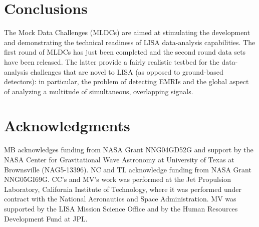 \documentclass{iopart}
\begin{document}
\section{Conclusions}

The Mock Data Challenges (MLDCs) are aimed at stimulating the development and demonstrating the technical readiness of LISA data-analysis capabilities. The first round of MLDCs has just been completed and the second round data sets have been released. The latter provide a fairly realistic testbed for the data-analysis challenges that are novel to LISA (as opposed to ground-based detectors): in particular, the problem of detecting EMRIs and the global aspect of analyzing a multitude of simultaneous, overlapping signals.

\section*{Acknowledgments}
MB acknowledges funding from NASA Grant NNG04GD52G and support by the NASA Center for Gravitational Wave Astronomy at University of Texas at Brownsville (NAG5-13396).
NC and TL acknowledge funding from NASA Grant NNG05GI69G.
CC's and MV's work was performed at the Jet Propulsion Laboratory, California Institute of Technology, where it was performed under contract with the National Aeronautics and Space Administration. MV was supported by the LISA Mission Science Office and by the Human Resources Development Fund at JPL.
\end{document}
